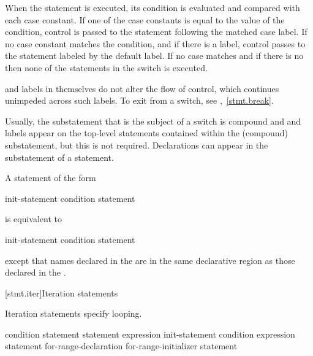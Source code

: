 \pnum
When the  statement is executed, its condition is
evaluated and compared with each case constant.
%
If one of the case constants is equal to the value of the condition,
control is passed to the statement following the matched case label. If
no case constant matches the condition, and if there is a
%
 label, control passes to the statement labeled by the
default label. If no case matches and if there is no 
then none of the statements in the switch is executed.

\pnum
{} and  labels in themselves do not alter the
flow of control, which continues unimpeded across such labels. To exit
from a switch, see ,~\ref{stmt.break}.
\begin{note}
Usually, the substatement that is the subject of a switch is compound
and  and  labels appear on the top-level
statements contained within the (compound) substatement, but this is not
required.
%
Declarations can appear in the substatement of a
 statement.
\end{note}

\pnum
A  statement of the form

\begin{ncbnf}
 init-statement condition \terminal{)} statement
\end{ncbnf}

is equivalent to

\begin{ncbnftab}
\terminal{\{}\br
\>init-statement\br
\> condition \terminal{)} statement\br
\terminal{\}}
\end{ncbnftab}

except that names declared in the  are in
the same declarative region as those declared in the
.%

[stmt.iter]{Iteration statements}%

\pnum
Iteration statements specify looping.

%
%
%
%
\begin{bnf}
\br
     condition \terminal{)} statement\br
     statement  expression \terminal{) ;}\br
     init-statement condition\opt{} \terminal{;} expression\opt{} \terminal{)} statement\br
     for-range-declaration \terminal{:} for-range-initializer \terminal{)} statement
\end{bnf}

